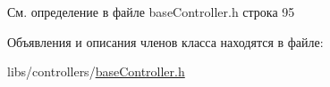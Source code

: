 См. определение в файле base\-Controller.\-h строка 95



Объявления и описания членов класса находятся в файле\-:\begin{DoxyCompactItemize}
\item 
libs/controllers/\hyperlink{base_controller_8h}{base\-Controller.\-h}\end{DoxyCompactItemize}

